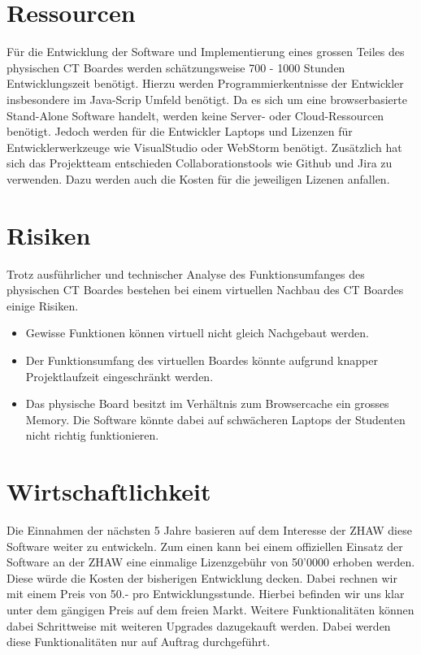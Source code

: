 \documentclass[10pt]{article}
\begin{document}
\section{Ressourcen}
Für die Entwicklung der Software und Implementierung eines grossen Teiles des physischen CT Boardes werden schätzungsweise 700 - 1000 Stunden Entwicklungszeit benötigt. Hierzu werden Programmierkentnisse der Entwickler insbesondere im Java-Scrip Umfeld benötigt. Da es sich um eine browserbasierte Stand-Alone Software handelt, werden keine Server- oder Cloud-Ressourcen benötigt. Jedoch werden für die Entwickler Laptops und Lizenzen für Entwicklerwerkzeuge wie VisualStudio oder WebStorm benötigt. Zusätzlich hat sich das Projektteam entschieden Collaborationstools wie Github und Jira zu verwenden. Dazu werden auch die Kosten für die jeweiligen Lizenen anfallen. 

\section{Risiken}
Trotz ausführlicher und technischer Analyse des Funktionsumfanges des physischen CT Boardes bestehen bei einem virtuellen Nachbau des CT Boardes einige Risiken. 
\begin{itemize}
\item Gewisse Funktionen können virtuell nicht gleich Nachgebaut werden. 
\item Der Funktionsumfang des virtuellen Boardes könnte aufgrund knapper Projektlaufzeit eingeschränkt werden. 
\item Das physische Board besitzt im Verhältnis zum Browsercache ein grosses Memory. Die Software könnte dabei auf schwächeren Laptops der Studenten nicht richtig funktionieren. 
\end{itemize}

\section{Wirtschaftlichkeit}
Die Einnahmen der nächsten 5 Jahre basieren auf dem Interesse der ZHAW diese Software weiter zu entwickeln. Zum einen kann bei einem offiziellen Einsatz der Software an der ZHAW eine einmalige Lizenzgebühr von 50'0000 erhoben werden. Diese würde die Kosten der bisherigen Entwicklung decken. Dabei rechnen wir mit einem Preis von 50.- pro Entwicklungsstunde. Hierbei befinden wir uns klar unter dem gängigen Preis auf dem freien Markt. Weitere Funktionalitäten können dabei Schrittweise mit weiteren Upgrades dazugekauft werden. Dabei werden diese Funktionalitäten nur auf Auftrag durchgeführt.
\end{document}

